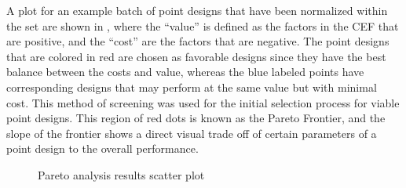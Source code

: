 A plot for an example batch of point designs that have been normalized within the set are shown in , where the ``value'' is defined as the factors in the CEF that are positive, and the ``cost'' are the factors that are negative. The point designs that are colored in red are chosen as favorable designs since they have the best balance between the costs and value, whereas the blue labeled points have corresponding designs that may perform at the same value but with minimal cost. This method of screening was used for the initial selection process for viable point designs. This region of red dots is known as the Pareto Frontier, and the slope of the frontier shows a direct visual trade off of certain parameters of a point design to the overall performance.

\begin{figure}
    \centering
    \caption{Pareto analysis results scatter plot}
    \label{figure:pareto-points}
\end{figure}


